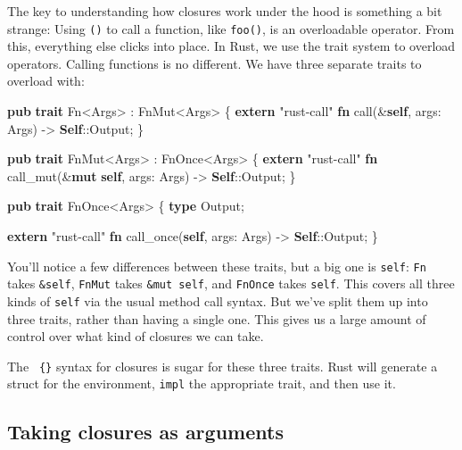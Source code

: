 \documentclass[a4paper,]{book}
\newenvironment{Shaded}{\begin{snugshade}}{\end{snugshade}}
\newcommand{\KeywordTok}[1]{\textcolor[rgb]{0.13,0.29,0.53}{\textbf{{#1}}}}
\newcommand{\StringTok}[1]{\textcolor[rgb]{0.31,0.60,0.02}{{#1}}}
\newcommand{\BuiltInTok}[1]{{#1}}
\newcommand{\NormalTok}[1]{{#1}}
\begin{document}
The key to understanding how closures work under the hood is something a
bit strange: Using \texttt{()} to call a function, like \texttt{foo()},
is an overloadable operator. From this, everything else clicks into
place. In Rust, we use the trait system to overload operators. Calling
functions is no different. We have three separate traits to overload
with:

\begin{Shaded}
\begin{Highlighting}[]
\KeywordTok{pub} \KeywordTok{trait} \BuiltInTok{Fn}\NormalTok{<Args> : }\BuiltInTok{FnMut}\NormalTok{<Args> \{}
    \KeywordTok{extern} \StringTok{"rust-call"} \KeywordTok{fn} \NormalTok{call(&}\KeywordTok{self}\NormalTok{, args: Args) -> }\KeywordTok{Self}\NormalTok{::Output;}
\NormalTok{\}}

\KeywordTok{pub} \KeywordTok{trait} \BuiltInTok{FnMut}\NormalTok{<Args> : }\BuiltInTok{FnOnce}\NormalTok{<Args> \{}
    \KeywordTok{extern} \StringTok{"rust-call"} \KeywordTok{fn} \NormalTok{call_mut(&}\KeywordTok{mut} \KeywordTok{self}\NormalTok{, args: Args) -> }\KeywordTok{Self}\NormalTok{::Output;}
\NormalTok{\}}

\KeywordTok{pub} \KeywordTok{trait} \BuiltInTok{FnOnce}\NormalTok{<Args> \{}
    \KeywordTok{type} \NormalTok{Output;}

    \KeywordTok{extern} \StringTok{"rust-call"} \KeywordTok{fn} \NormalTok{call_once(}\KeywordTok{self}\NormalTok{, args: Args) -> }\KeywordTok{Self}\NormalTok{::Output;}
\NormalTok{\}}
\end{Highlighting}
\end{Shaded}

You'll notice a few differences between these traits, but a big one is
\texttt{self}: \texttt{Fn} takes \texttt{\&self}, \texttt{FnMut} takes
\texttt{\&mut\ self}, and \texttt{FnOnce} takes \texttt{self}. This
covers all three kinds of \texttt{self} via the usual method call
syntax. But we've split them up into three traits, rather than having a
single one. This gives us a large amount of control over what kind of
closures we can take.

The \texttt{\textbar{}\textbar{}\ \{\}} syntax for closures is sugar for
these three traits. Rust will generate a struct for the environment,
\texttt{impl} the appropriate trait, and then use it.

\subsection{Taking closures as
arguments}\label{taking-closures-as-arguments}
\end{document}
